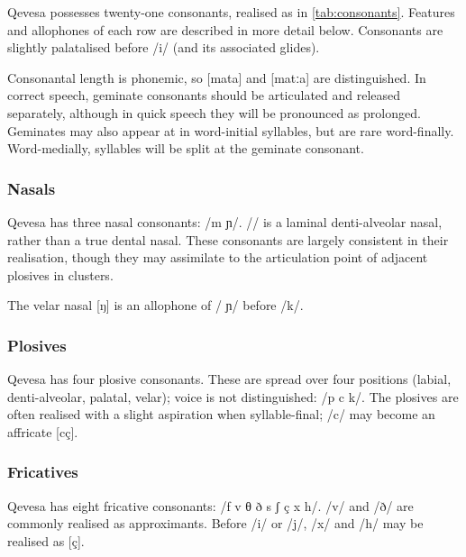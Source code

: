 \documentclass[grammar]{subfiles}
\begin{document}
  Qevesa possesses twenty-one consonants, realised as in
  \cref{tab:consonants}.  Features and allophones of each row are
  described in more detail below.  Consonants are slightly palatalised before
  /i/ (and its associated glides).

  Consonantal length is phonemic, so [mata] and [matːa] are distinguished.  In
  correct speech, geminate consonants should be articulated and released
  separately, although in quick speech they will be pronounced as prolonged.
  Geminates may also appear at in word-initial syllables, but are rare
  word-finally.  Word-medially, syllables will be split at the geminate
  consonant.

  \subsubsection{Nasals}
  \label{sssec:nasals}

  Qevesa has three nasal consonants: /m  ɲ/.  // is a laminal
  denti-alveolar nasal, rather than a true dental nasal.  These consonants are
  largely consistent in their realisation, though they may assimilate to the
  articulation point of adjacent plosives in clusters. 

  The velar nasal [ŋ] is an allophone of / ɲ/ before /k/.

  \subsubsection{Plosives}
  \label{sssec:plosives}

  Qevesa has four plosive consonants.  These are spread over four positions
  (labial, denti-alveolar, palatal, velar); voice is not distinguished: /p
   c k/.  The plosives are often realised with a slight aspiration when
  syllable-final; /c/ may become an affricate [cç].  
  

  \subsubsection{Fricatives}
  \label{sssec:fricatives}

  Qevesa has eight fricative consonants: /f v θ ð s ʃ ç x h/.  /v/ and /ð/ are
  commonly realised as approximants.  Before /i/ or /j/, /x/ and /h/ may be
  realised as [ç].
% 
\end{document}
